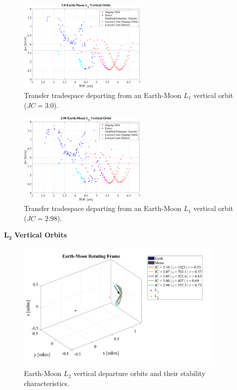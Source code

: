 \begin{figure}[ht]
    \centering
    \includegraphics[width=0.55\textwidth]{figures/TradeSpace_L1Vertical_3_00.pdf}
    \caption{Transfer tradespace departing from an Earth-Moon $L_{1}$ vertical orbit ($JC=3.0$).}
\end{figure}

\begin{figure}[ht]
    \centering
    \includegraphics[width=0.55\textwidth]{figures/TradeSpace_L1Vertical_2_98.pdf}
    \caption{Transfer tradespace departing from an Earth-Moon $L_{1}$ vertical orbit ($JC=2.98$).}
\end{figure}
\clearpage

$\pmb{L_{2}}$ \textbf{Vertical Orbits}
\begin{figure}[ht]
    \centering
    \includegraphics[width=0.9\textwidth]{figures/L2VerticalDepartureOrbits.pdf}
    \caption{Earth-Moon $L_{2}$ vertical departure orbits and their stability characteristics.}
\end{figure}

